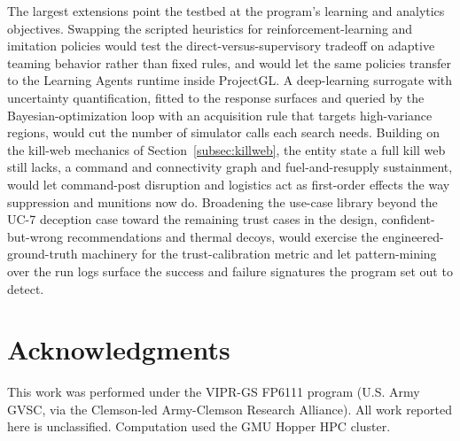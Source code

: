 \documentclass[11pt]{article}
\begin{document}
The largest extensions point the testbed at the program's learning and analytics objectives. Swapping the scripted heuristics for reinforcement-learning and imitation policies would test the direct-versus-supervisory tradeoff on adaptive teaming behavior rather than fixed rules, and would let the same policies transfer to the Learning Agents runtime inside ProjectGL. A deep-learning surrogate with uncertainty quantification, fitted to the response surfaces and queried by the Bayesian-optimization loop \citep{balandat2020botorch} with an acquisition rule that targets high-variance regions, would cut the number of simulator calls each search needs. Building on the kill-web mechanics of Section~\ref{subsec:killweb}, the entity state a full kill web still lacks, a command and connectivity graph and fuel-and-resupply sustainment, would let command-post disruption and logistics act as first-order effects the way suppression and munitions now do. Broadening the use-case library beyond the UC-7 deception case toward the remaining trust cases in the design, confident-but-wrong recommendations and thermal decoys, would exercise the engineered-ground-truth machinery for the trust-calibration metric and let pattern-mining over the run logs surface the success and failure signatures the program set out to detect.

\section*{Acknowledgments}
This work was performed under the VIPR-GS FP6111 program (U.S. Army GVSC, via the Clemson-led Army-Clemson Research Alliance). All work reported here is unclassified. Computation used the GMU Hopper HPC cluster.


\end{document}
